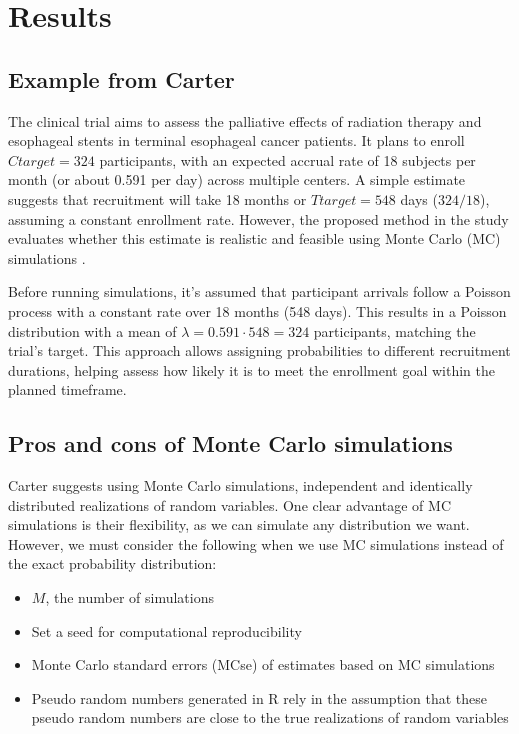 




\chapter{Results}


\section{Example from Carter}

The clinical trial aims to assess the palliative effects of radiation therapy and esophageal stents in terminal esophageal cancer patients. It plans to enroll $Ctarget = 324$ participants, with an expected accrual rate of 18 subjects per month (or about 0.591 per day) across multiple centers. A simple estimate suggests that recruitment will take 18 months or $Ttarget=548$ days ($324/18$), assuming a constant enrollment rate. However, the proposed method in the study evaluates whether this estimate is realistic and feasible using Monte Carlo (MC) simulations \citep{carter2004application}.

Before running simulations, it's assumed that participant arrivals follow a Poisson process with a constant rate over 18 months (548 days). This results in a Poisson distribution with a mean of $\lambda = 0.591 \cdot 548 = 324$ participants, matching the trial's target. This approach allows assigning probabilities to different recruitment durations, helping assess how likely it is to meet the enrollment goal within the planned timeframe.


\section{Pros and cons of Monte Carlo simulations}

Carter suggests using Monte Carlo simulations, independent and identically distributed realizations of random variables. One clear advantage of MC simulations is their flexibility, as we can simulate any distribution we want. However, we must consider the following when we use MC simulations instead of the exact probability distribution:

\begin{itemize}
\item $M$, the number of simulations
\item Set a seed for computational reproducibility
\item Monte Carlo standard errors (MCse) of estimates based on MC simulations
\item Pseudo random numbers generated in R rely in the assumption that these pseudo random numbers are close to the true realizations of random variables \citep{held2014applied}
\end{itemize}


